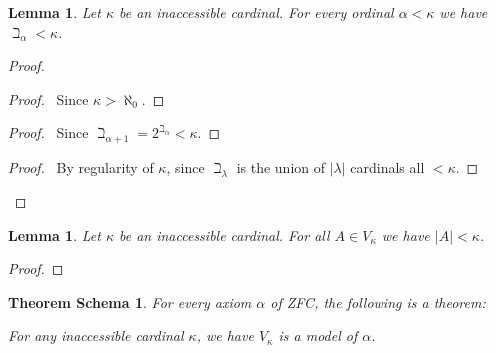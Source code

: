 \documentclass{book}
\let\qed\relax
\newtheorem{thms}[ax]{Theorem Schema}
\newtheorem{lm}[ax]{Lemma}
\theoremstyle{definition}
\begin{document}

\begin{lm}
Let $\kappa$ be an inaccessible cardinal. For every ordinal $\alpha < \kappa$ we have $\beth_\alpha < \kappa$.
\end{lm}

\begin{proof}
\pf
{}
\begin{proof}
	\pf\ Since $\kappa > \aleph_0$.
\end{proof}
\begin{proof}
	\pf\ Since $\beth_{\alpha + 1} = 2^{\beth_\alpha} < \kappa$.
\end{proof}
\begin{proof}
	\pf\ By regularity of $\kappa$, since $\beth_\lambda$ is the union of $|\lambda|$ cardinals all $< \kappa$.
\end{proof}
\qed
\end{proof}

\begin{lm}
Let $\kappa$ be an inaccessible cardinal. For all $A \in V_\kappa$ we have $|A| < \kappa$.
\end{lm}

\begin{proof}
\pf
{}
\qed
\end{proof}

\begin{thms}
For every axiom $\alpha$ of ZFC, the following is a theorem:

For any inaccessible cardinal $\kappa$, we have $V_\kappa$ is a model of $\alpha$.
\end{thms}
\end{document}
